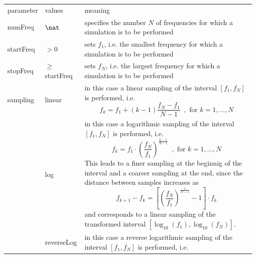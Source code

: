 \begin{center}
\begin{longtable}{llp{}}
\hline\noalign{\smallskip}
parameter & values & meaning \\
\noalign{\smallskip}\hline\noalign{\smallskip}
numFreq & $\nat$ & specifies the number $N$ of frequencies for which
                   a simulation is to be performed\\
\noalign{\smallskip}\hline\noalign{\smallskip}
startFreq & $> 0$ & sets $f_1$, i.e. the smallest frequency for which a
                    simulation is to be performed\\
\noalign{\smallskip}\hline\noalign{\smallskip}
stopFreq & $\geqslant$ startFreq & sets $f_N$, i.e. the largest frequency for
                                   which a simulation is to be performed\\
\noalign{\smallskip}\hline\noalign{\smallskip}
sampling & linear & in this case a linear sampling of the interval
                    $[f_1,f_N]$ is performed, i.e.
                    \begin{displaymath}
                    f_k = f_1 + (k-1) \frac{f_N - f_1}{N-1}
                    \enspace,\mbox{ for } k = 1,\ldots,N
                    \end{displaymath}\\
         & log    & in this case a logarithmic sampling of the interval
                    $[f_1,f_N]$ is performed, i.e.
                    \begin{displaymath}
                    f_k = f_1 \cdot
                    \left(\frac{f_N}{f_1}\right)^{\frac{k-1}{N-1}}
                    \enspace,\mbox{ for } k = 1,\ldots,N
                    \end{displaymath}
                    This leads to a finer sampling at the beginnig of the
                    interval and a coarser sampling at the end, since the
                    distance between samples increases as
                    \begin{displaymath}
                    f_{k+1} - f_k = \left[
                    \left(\frac{f_N}{f_1}\right)^{\frac{1}{N-1}}
                    - 1 \right] \cdot f_k
                    \end{displaymath}
                    and corresponds to a linear sampling of the transformed
                    interval $[\log_{10}(f_1),\log_{10}(f_N)]$.\\[1ex]
         & reverseLog & in this case a reverse logarithmic sampling of the
                        interval $[f_1,f_N]$ is performed, i.e.

\end{longtable}
\end{center}
